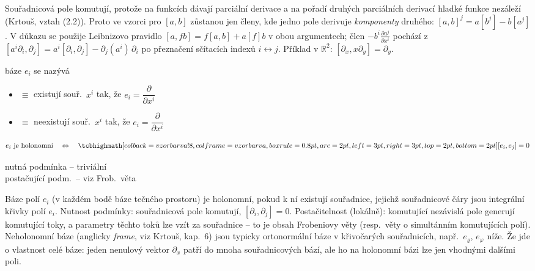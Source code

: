 \begin{vysvetleni}
Souřadnicová pole komutují, protože na funkcích dávají parciální derivace a na pořadí druhých parciálních derivací hladké funkce nezáleží (Krtouš, vztah (2.2)). Proto ve vzorci pro $[a,b]$ zůstanou jen členy, kde jedno pole derivuje \emph{komponenty} druhého: $[a,b]^j=a[b^j]-b[a^j]$. V důkazu se použije Leibnizovo pravidlo $[a,fb]=f[a,b]+a[f]b$ v obou argumentech; člen $-b^i\frac{\partial a^j}{\partial x^i}$ pochází z $[a^i\partial_i,\partial_j]=a^i[\partial_i,\partial_j]-\partial_j(a^i)\,\partial_i$ po přeznačení sčítacích indexů $i\leftrightarrow j$. Příklad v $\mathbb{R}^2$: $[\partial_x,x\partial_y]=\partial_y$.
\end{vysvetleni}

\begin{definice}
báze $e_i$ se nazývá
\begin{itemize}[nosep]
  \item {} $\equiv$ existují souř.\ $x^i$ tak, že $e_i = \dfrac{\partial}{\partial x^i}$
  \item {} $\equiv$ neexistují souř.\ $x^i$ tak, že $e_i = \dfrac{\partial}{\partial x^i}$
\end{itemize}
\end{definice}

\begin{veta}
\[
  e_i \text{ je holonomní} \quad\Leftrightarrow\quad \vzorec{[e_i, e_j] = 0}
\]
\end{veta}
\quad nutná podmínka -- triviální \\
\quad postačující podm.\ -- viz Frob.\ věta


\begin{vysvetleni}
Báze polí $e_i$ (v každém bodě báze tečného prostoru) je holonomní, pokud k ní existují souřadnice, jejichž souřadnicové čáry jsou integrální křivky polí $e_i$. Nutnost podmínky: souřadnicová pole komutují, $[\partial_i,\partial_j]=0$. Postačitelnost (lokálně): komutující nezávislá pole generují komutující toky, a parametry těchto toků lze vzít za souřadnice -- to je obsah Frobeniovy věty (resp.\ věty o simultánním  komutujících polí). Neholonomní báze (anglicky \emph{frame}, viz Krtouš, kap.~6) jsou typicky ortonormální báze v křivočarých souřadnicích, např.\ $e_\varrho$, $e_\varphi$ níže. Že jde o vlastnost celé báze: jeden nenulový vektor $\partial_x$ patří do mnoha souřadnicových bází, ale  ho na holonomní bázi lze jen vhodnými dalšími poli.
\end{vysvetleni}

